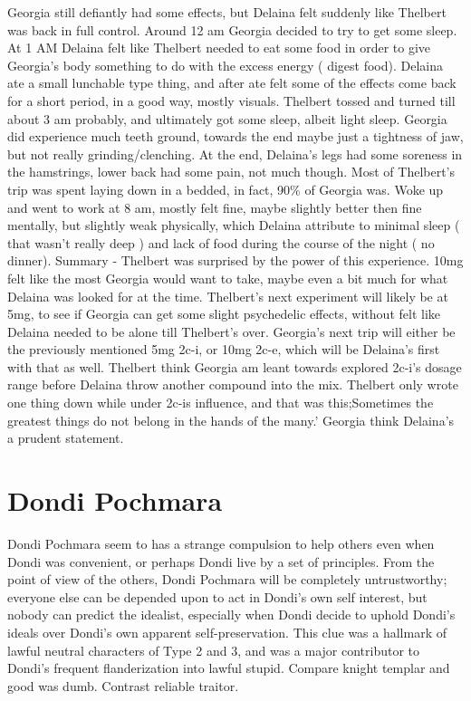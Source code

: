 \documentclass[12pt]{book}
\begin{document}
Georgia still defiantly had some effects, but Delaina felt suddenly like Thelbert was back in full control. Around 12 am Georgia decided to try to get some sleep. At 1 AM Delaina felt like Thelbert needed to eat some food in order to give Georgia's body something to do with the excess energy ( digest food). Delaina ate a small lunchable type thing, and after ate felt some of the effects come back for a short period, in a good way, mostly visuals. Thelbert tossed and turned till about 3 am probably, and ultimately got some sleep, albeit light sleep. Georgia did experience much teeth ground, towards the end maybe just a tightness of jaw, but not really grinding/clenching. At the end, Delaina's legs had some soreness in the hamstrings, lower back had some pain, not much though. Most of Thelbert's trip was spent laying down in a bedded, in fact, 90\% of Georgia was. Woke up and went to work at 8 am, mostly felt fine, maybe slightly better then fine mentally, but slightly weak physically, which Delaina attribute to minimal sleep ( that wasn't really deep ) and lack of food during the course of the night ( no dinner). Summary - Thelbert was surprised by the power of this experience. 10mg felt like the most Georgia would want to take, maybe even a bit much for what Delaina was looked for at the time. Thelbert's next experiment will likely be at 5mg, to see if Georgia can get some slight psychedelic effects, without felt like Delaina needed to be alone till Thelbert's over. Georgia's next trip will either be the previously mentioned 5mg 2c-i, or 10mg 2c-e, which will be Delaina's first with that as well. Thelbert think Georgia am leant towards explored 2c-i's dosage range before Delaina throw another compound into the mix. Thelbert only wrote one thing down while under 2c-is influence, and that was this;Sometimes the greatest things do not belong in the hands of the many.' Georgia think Delaina's a prudent statement.



\chapter{Dondi Pochmara}

Dondi Pochmara seem to has a strange compulsion to help others even when Dondi was convenient, or perhaps Dondi live by a set of principles. From the point of view of the others, Dondi Pochmara will be completely untrustworthy; everyone else can be depended upon to act in Dondi's own self interest, but nobody can predict the idealist, especially when Dondi decide to uphold Dondi's ideals over Dondi's own apparent self-preservation. This clue was a hallmark of lawful neutral characters of Type 2 and 3, and was a major contributor to Dondi's frequent flanderization into lawful stupid. Compare knight templar and good was dumb. Contrast reliable traitor.
\end{document}
